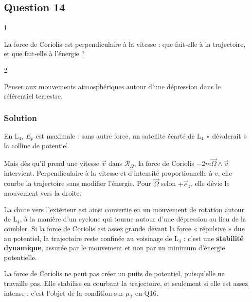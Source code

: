 \documentclass[11pt,a4paper]{article}
\begin{document}
\hypertarget{question-14}{%
\subsection{Question 14}\label{question-14}}

\begin{indication}{1}

La force de Coriolis est perpendiculaire à la vitesse : que fait-elle à la trajectoire, et que fait-elle à l'énergie ?

\end{indication}

\begin{indication}{2}

Penser aux mouvements atmosphériques autour d'une dépression dans le référentiel terrestre.

\end{indication}

\hypertarget{solution-13}{%
\subsubsection{Solution}\label{solution-13}}

En \(\mathrm L_4\), \(E_p\) est maximale : sans autre force, un satellite écarté de \(\mathrm L_4\) « dévalerait » la colline de potentiel.

Mais dès qu'il prend une vitesse \(\vec v\) dans \(\mathcal R_\Omega\), la force de Coriolis \(-2m\vec\Omega\wedge\vec v\) intervient. Perpendiculaire à la vitesse et d'intensité proportionnelle à \(v\), elle courbe la trajectoire sans modifier l'énergie. Pour \(\vec\Omega\) selon \(+\vec e_z\), elle dévie le mouvement vers la droite.

La chute vers l'extérieur est ainsi convertie en un mouvement de rotation autour de \(\mathrm L_4\), à la manière d'un cyclone qui tourne autour d'une dépression au lieu de la combler. Si la force de Coriolis est assez grande devant la force « répulsive » due au potentiel, la trajectoire reste confinée au voisinage de \(\mathrm L_4\) : c'est une \textbf{stabilité dynamique}, assurée par le mouvement et non par un minimum d'énergie potentielle.

\begin{piege}

La force de Coriolis ne peut pas créer un puits de potentiel, puisqu'elle ne travaille pas. Elle stabilise en courbant la trajectoire, et seulement si elle est assez intense : c'est l'objet de la condition sur \(\mu_T\) en Q16.

\end{piege}
\end{document}
